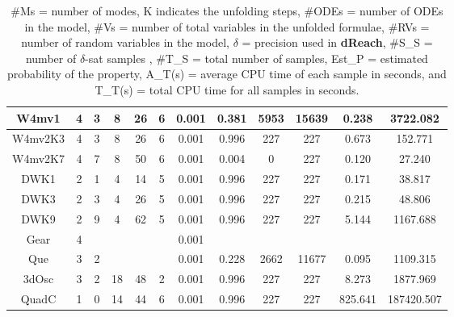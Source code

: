 \begin{table}[h]
\begin{tabular}{c|c|c|c|c|c|c|c|c|c|c|c}
    W4mv1       & 4       & 3 & 8      & 26     & 6     & 0.001 & 0.381      & 5953         & 15639        & 0.238   & 3722.082     \\ \hline
    W4mv2K3       & 4       & 3 & 8      & 26     & 6     & 0.001 & 0.996      & 227         & 227        & 0.673   & 152.771      \\ \hline
    W4mv2K7       & 4       & 7 & 8      & 50     & 6     & 0.001 & 0.004     & 0         & 227        & 0.120    & 27.240          \\ \hline
    DWK1      & 2       & 1 & 4      & 14    & 5     & 0.001 & 0.996  & 227       & 227      & 0.171   & 38.817      \\ \hline
    DWK3      & 2       & 3 & 4      & 26    & 5     & 0.001 & 0.996  & 227       & 227      & 0.215    & 48.806      \\ \hline
    DWK9      & 2       & 9 & 4      & 62    & 5     & 0.001 & 0.996  & 227       & 227      & 5.144   &  1167.688      \\ \hline
    Gear      & 4       & ~ & ~      & ~     & ~     & 0.001 & ~      & ~         & ~        & ~     & ~          \\ \hline
    Que       & 3       & 2 & ~      & ~     & ~     & 0.001 & 0.228      & 2662         & 11677        & 0.095   & 1109.315   \\ \hline
    3dOsc     & 3       & 2 & 18      & 48     & 2     & 0.001 & 0.996      & 227         & 227        & 8.273  & 1877.969   \\ \hline
    QuadC     & 1       & 0 & 14      & 44     & 6     & 0.001 & 0.996      & 227         & 227        & 825.641 & 187420.507   \\ \hline
    \end{tabular}
    \caption {\#Ms = number of modes, K indicates the unfolding steps, \#ODEs = number of ODEs in the model, \#Vs = number of total variables in the unfolded formulae, \#RVs = number of random variables in the model, $\delta$ = precision used in 
{\bf dReach}, \#S\_S = number of $\delta$-sat samples , \#T\_S = total number of samples, Est\_P = estimated 
probability of the property,  A\_T(s) = average CPU time of each sample in seconds, and T\_T(s) = total CPU time for all samples in seconds.}
    \label{table:exp}
\end{table}
